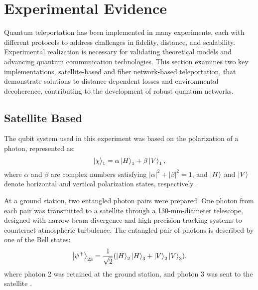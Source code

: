 \section{Experimental Evidence}
Quantum teleportation has been implemented in many experiments, 
each with different protocols to address challenges in fidelity, distance, and scalability. 
Experimental realization is necessary for validating theoretical models and advancing quantum communication technologies. 
This section examines two key implementations, satellite-based and fiber network-based teleportation, that demonstrate 
solutions to distance-dependent losses and environmental decoherence, contributing to the development of robust quantum networks.

\subsection{Satellite Based}


The qubit system used in this experiment was based on the polarization of a photon, represented as:  
\begin{equation}
    \ket{\chi}_1 = \alpha\ket{H}_1 + \beta\ket{V}_1,
\end{equation}
where \(\alpha\) and \(\beta\) are complex numbers satisfying \(|\alpha|^2 + |\beta|^2 = 1\), and \(\ket{H}\) and \(\ket{V}\) denote 
horizontal and vertical polarization states, respectively \cite{Ren:2017}.  

At a ground station, two entangled photon pairs were prepared. One photon from each pair was transmitted to a satellite through a 
130-mm-diameter telescope, designed with narrow beam divergence and high-precision tracking systems to counteract atmospheric turbulence. 
The entangled pair of photons is described by one of the Bell states:
\begin{equation}
    \ket{\psi^{+}}_{23} = \frac{1}{\sqrt{2}} (\ket{H}_2\ket{H}_3 + \ket{V}_2\ket{V}_3),
\end{equation}
where photon 2 was retained at the ground station, and photon 3 was sent to the satellite \cite{Ren:2017}.

